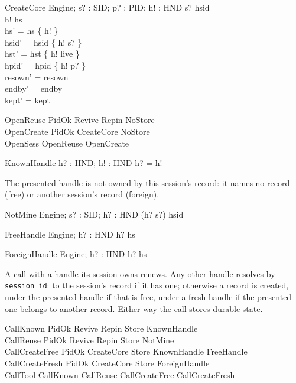\documentclass[a4paper,10pt,fleqn]{article}
\begin{document}
\begin{schema}{CreateCore}
  \Delta Engine; s? : SID; p? : PID; h! : HND
\where
  s? \notin \ran hsid \\
  h! \notin hs \\
  hs' = hs \cup \{ h! \} \\
  hsid' = hsid \cup \{ h! \mapsto s? \} \\
  hst' = hst \cup \{ h! \mapsto live \} \\
  hpid' = hpid \cup \{ h! \mapsto p? \} \\
  resown' = resown \\
  endby' = endby \\
  kept' = kept
\end{schema}

\begin{zed}
  OpenReuse  PidOk \land Revive \land Repin \land NoStore \\
  OpenCreate  PidOk \land CreateCore \land NoStore \\
  OpenSess  OpenReuse \lor OpenCreate
\end{zed}

\begin{schema}{KnownHandle}
  h? : HND; h! : HND
\where
  h? = h!
\end{schema}

The presented handle is not owned by this session's record: it names no record
(free) or another session's record (foreign).

\begin{schema}{NotMine}
  Engine; s? : SID; h? : HND
\where
  (h? \mapsto s?) \notin hsid
\end{schema}

\begin{schema}{FreeHandle}
  Engine; h? : HND
\where
  h? \notin hs
\end{schema}

\begin{schema}{ForeignHandle}
  Engine; h? : HND
\where
  h? \in hs
\end{schema}

A call with a handle its session owns renews.  Any other handle resolves by
\texttt{session\_id}: to the session's record if it has one; otherwise a record
is created, under the presented handle if that is free, under a fresh handle if
the presented one belongs to another record.  Either way the call stores
durable state.

\begin{zed}
  CallKnown  PidOk \land Revive \land Repin \land Store \land KnownHandle \\
  CallReuse  PidOk \land Revive \land Repin \land Store \land NotMine \\
  CallCreateFree 
    PidOk \land CreateCore \land Store \land KnownHandle \land FreeHandle \\
  CallCreateFresh  PidOk \land CreateCore \land Store \land ForeignHandle \\
  CallTool  CallKnown \lor CallReuse \lor CallCreateFree \lor CallCreateFresh
\end{zed}
\end{document}
